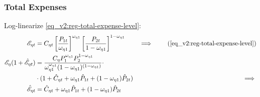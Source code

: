 \documentclass[../thesis.tex]{subfiles}
\begin{document}


\subsubsection*{Total Expenses}

Log-linearize \ref{eq_v2:reg-total-expense-level}:
	\begin{alignat}{2}
		\te &= C_{\eta t} \left[ \frac{P_{1 t}}{\omega_{\eta 1}} \right]^{\omega_{\eta 1}} \left[ \frac{P_{2 t}}{1 -\omega_{\eta 1}} \right]^{1 -\omega_{\eta 1}} &\implies \tag{\ref{eq_v2:reg-total-expense-level}} \\
		\te[] (1 + \hat{\mathscr{E}}_{\eta t}) &= \frac{C_{\eta} P_{1}^{\omega_{\eta 1}} P_{2}^{1 -\omega_{\eta 1}}}{\omega_{\eta 1}^{\omega_{\eta 1}} (1 - \omega_{\eta 1})^{(1 - \omega_{\eta 1})}} \cdot \nonumber \\
		 \qquad &\cdot (1 + \hat{C}_{\eta t} + \omega_{\eta 1} \hat{P}_{1 t} + (1 -\omega_{\eta 1}) \hat{P}_{2 t}) &\implies \nonumber \\
		\hat{\mathscr{E}}_{\eta t} &= \hat{C}_{\eta t} + \omega_{\eta 1} \hat{P}_{1 t} + (1 -\omega_{\eta 1}) \hat{P}_{2 t} \label{eq_v2:reg-ll-total-expense-level}
	\end{alignat}


\begin{comment}
	
Isolate $\hat{\mathscr{E}}_{\eta t}$ in \ref{eq_v2:reg-ll-regional-consumption-and-prices} and substitute in \ref{eq_v2:reg-ll-total-expense-level}:
\begin{align}
	\hat{C}_{\eta 1 t} &= \hat{\mathscr{E}}_{\eta t} - \hat{P}_{\eta t} \iff \hat{\mathscr{E}}_{\eta t} = \hat{C}_{\eta 1 t} + \hat{P}_{\eta t} \tag{\ref{eq_v2:reg-ll-regional-consumption-and-prices}} \\
	\hat{C}_{\eta 1 t} + \hat{P}_{\eta t} &= \hat{C}_{\eta t} + \omega_{\eta 1} \hat{P}_{\eta t} + (1 -\omega_{\eta 1}) \hat{P}_{\nu t} \implies \nonumber \\
	\hat{C}_{\eta t} - \hat{C}_{\eta 1 t} &= (1 -\omega_{\eta 1}) (\hat{P}_{\eta t} - \hat{P}_{\nu t}) \label{eq_v2:reg-ll-total-expense-level-2}
\end{align}

Equation \ref{eq_v2:reg-ll-total-expense-level-2} shows that the distance between the regional consumption and the good $\eta$ consumption is proportional to the distance between the variations of both regional price levels.	
	
\end{comment}
\end{document}
